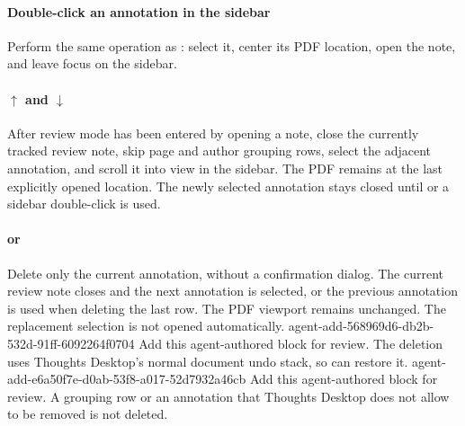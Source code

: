 \paragraph{Double-click an annotation in the sidebar}
Perform the same operation as : select it, center its PDF location, open the note, and leave focus on the sidebar.

\paragraph{\(\uparrow\) and \(\downarrow\)}
After review mode has been entered by opening a note, close the currently tracked review note, skip page and author grouping rows, select the adjacent annotation, and scroll it into view in the sidebar.
The PDF remains at the last explicitly opened location.
The newly selected annotation stays closed until  or a sidebar double-click is used.

\paragraph{ or }
Delete only the current annotation, without a confirmation dialog.
The current review note closes and the next annotation is selected, or the previous annotation is used when deleting the last row.
The PDF viewport remains unchanged.
The replacement selection is not opened automatically.
\agentProposedEdit
  {agent-add-568969d6-db2b-532d-91ff-6092264f0704}
  {Add this agent-authored block for review.}
  {}
  {The deletion uses Thoughts Desktop's normal document undo stack, so  can restore it.}
\agentProposedEdit
  {agent-add-e6a50f7e-d0ab-53f8-a017-52d7932a46cb}
  {Add this agent-authored block for review.}
  {}
  {A grouping row or an annotation that Thoughts Desktop does not allow to be removed is not deleted.}

